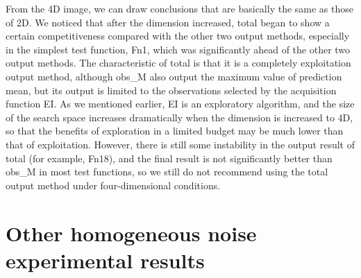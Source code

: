\documentclass{article}
\begin{document}
From the 4D image, we can draw conclusions that are basically the same as those of 2D. We noticed that after the dimension increased, total began to show a certain competitiveness compared with the other two output methods, especially in the simplest test function, Fn1, which was significantly ahead of the other two output methods. The characteristic of total is that it is a completely exploitation output method, although obs\_M also output the maximum value of prediction mean, but its output is limited to the observations selected by the acquisition function EI. As we mentioned earlier, EI is an exploratory algorithm, and the size of the search space increases dramatically when the dimension is increased to 4D, so that the benefits of exploration in a limited budget may be much lower than that of exploitation. However, there is still some instability in the output result of total (for example, Fn18), and the final result is not significantly better than obs\_M in most test functions, so we still do not recommend using the total output method under four-dimensional conditions.

\section{Other homogeneous noise experimental results}
\end{document}
